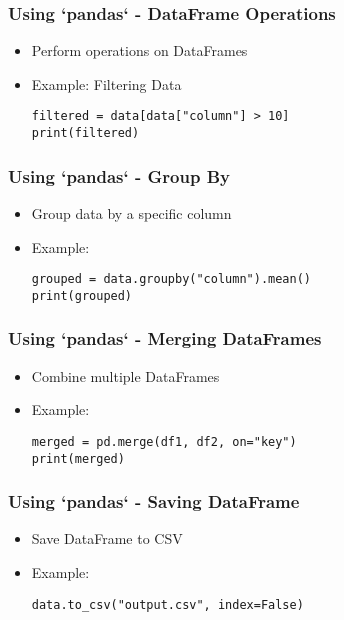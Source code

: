 \documentclass{beamer}
\begin{document}
\begin{frame}
    \frametitle{Using `pandas` - DataFrame Operations}
    \begin{itemize}
        \item Perform operations on DataFrames
        \item Example: Filtering Data
        \begin{tcolorbox}[colback=lightblue, colframe=darkblue, title=Filter DataFrame]
            \lstinline|filtered = data[data["column"] > 10]| \\
            \lstinline|print(filtered)|
        \end{tcolorbox}
    \end{itemize}
\end{frame}

\begin{frame}
    \frametitle{Using `pandas` - Group By}
    \begin{itemize}
        \item Group data by a specific column
        \item Example:
        \begin{tcolorbox}[colback=lightblue, colframe=darkblue, title=Group By]
            \lstinline|grouped = data.groupby("column").mean()| \\
            \lstinline|print(grouped)|
        \end{tcolorbox}
    \end{itemize}
\end{frame}

\begin{frame}
    \frametitle{Using `pandas` - Merging DataFrames}
    \begin{itemize}
        \item Combine multiple DataFrames
        \item Example:
        \begin{tcolorbox}[colback=lightblue, colframe=darkblue, title=Merging DataFrames]
            \lstinline|merged = pd.merge(df1, df2, on="key")| \\
            \lstinline|print(merged)|
        \end{tcolorbox}
    \end{itemize}
\end{frame}

\begin{frame}
    \frametitle{Using `pandas` - Saving DataFrame}
    \begin{itemize}
        \item Save DataFrame to CSV
        \item Example:
        \begin{tcolorbox}[colback=lightblue, colframe=darkblue, title=Save DataFrame]
            \lstinline|data.to_csv("output.csv", index=False)|
        \end{tcolorbox}
    \end{itemize}
\end{frame}
\end{document}
